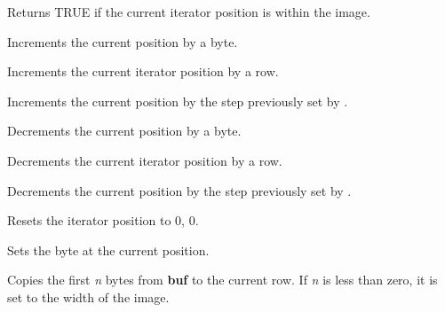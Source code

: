 
Returns TRUE if the current iterator position is within the image.



Increments the current position by a byte.



Increments the current iterator position by a row.



Increments the current position by the step previously set by .



Decrements the current position by a byte.



Decrements the current iterator position by a row.



Decrements the current position by the step previously set by .



Resets the iterator position to 0, 0.



Sets the byte at the current position.



Copies the first {\it n} bytes from {\bf buf} to the current row. If {\it n} is less than zero,
it is set to the width of the image.

\label{setsteps}

